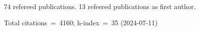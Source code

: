 74 refereed publications. 13 refeered publications as first author.

Total citations~=~4160; h-index~=~35 (2024-07-11)